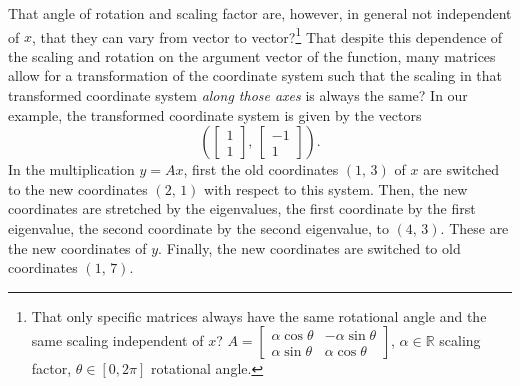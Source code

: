 \documentclass[graybox]{svmult}
\newcommand{\R}{\mathds{R}}
\begin{document}
That angle of rotation and scaling factor are, however, in general not independent of $x$, that they can vary from vector to vector?\footnote{That only specific matrices always have the same rotational angle and the same scaling independent of $x$? $A=\left[\begin{array}{cc}
\alpha \cos\theta & -\alpha\sin\theta \\
\alpha \sin\theta & \alpha\cos\theta
\end{array}\right]$, $\alpha\in\R$ scaling factor, $\theta\in [0, 2\pi]$ rotational angle.}
That despite this dependence of the scaling and rotation on the argument vector of the function, many matrices allow for a transformation of the coordinate system such that the scaling in that transformed coordinate system \textit{along those axes} is always the same? In our example, the transformed coordinate system is given by the vectors
\[
\left(\left[\begin{array}{c} 1 \\ 1\end{array}\right],\, \left[\begin{array}{c} -1 \\ 1\end{array}\right]\right).
\]
In the multiplication $y=Ax$, first the old coordinates $(1,\, 3)$ of
$x$ are switched to the new coordinates $(2,\, 1)$ with respect to this system.  Then, the
new coordinates are stretched by the eigenvalues, the first coordinate by
the first eigenvalue, the second coordinate by the second eigenvalue, to
$(4,\, 3)$.  These are the new coordinates of $y$. Finally, the
new coordinates are switched to old coordinates $(1,\, 7)$.
\end{document}
